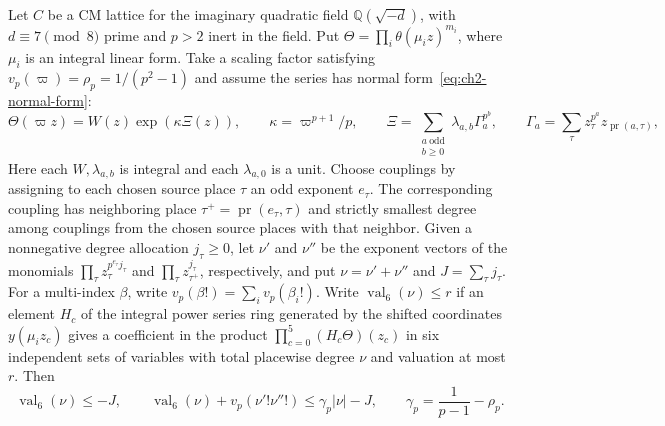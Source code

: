 \begin{lemma}
\label{lem:c-derivative-six-coupling}
\emitthmsource
Let $C$ be a CM lattice for the imaginary quadratic field $\mathbb Q(\sqrt{-d})$, with $d\equiv7\pmod8$ prime and $p>2$ inert in the field. Put $\Theta=\prod_i\theta(\mu_i z)^{m_i}$, where $\mu_i$ is an integral linear form. Take a scaling factor satisfying $v_p(\varpi)=\rho_p=1/(p^2-1)$ and assume the series has normal form~\eqref{eq:ch2-normal-form}:
\[
 \Theta(\varpi z)=W(z)\exp(\kappa\Xi(z)),\qquad
 \kappa=\varpi^{p+1}/p,\qquad
 \Xi=\sum_{\substack{a\ \text{odd}\\ b\ge0}}\lambda_{a,b}\Gamma_a^{p^b},
 \qquad
 \Gamma_a=\sum_\tau z_\tau^{p^a}z_{\operatorname{pr}(a,\tau)},
\]
Here each $W,\lambda_{a,b}$ is integral and each $\lambda_{a,0}$ is a unit. Choose couplings by assigning to each chosen source place $\tau$ an odd exponent $e_\tau$. The corresponding coupling has neighboring place $\tau^+=\operatorname{pr}(e_\tau,\tau)$ and strictly smallest degree among couplings from the chosen source places with that neighbor. Given a nonnegative degree allocation $j_\tau\ge0$, let $\nu'$ and $\nu''$ be the exponent vectors of the monomials $\prod_\tau z_\tau^{p^{e_\tau}j_\tau}$ and $\prod_\tau z_{\tau^+}^{j_\tau}$, respectively, and put $\nu=\nu'+\nu''$ and $J=\sum_\tau j_\tau$. For a multi-index $\beta$, write $v_p(\beta!)=\sum_i v_p(\beta_i!)$. Write $\operatorname{val}_6(\nu)\le r$ if an element $H_c$ of the integral power series ring generated by the shifted coordinates $y(\mu_i z_c)$ gives a coefficient in the product $\prod_{c=0}^5(H_c\Theta)(z_c)$ in six independent sets of variables with total placewise degree $\nu$ and valuation at most $r$. Then
\[
 \operatorname{val}_6(\nu)\le -J,\qquad
 \operatorname{val}_6(\nu)+v_p(\nu'!\nu''!)\le\gamma_p|\nu|-J,
 \qquad \gamma_p=\frac1{p-1}-\rho_p.
\]
\end{lemma}

